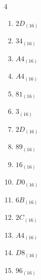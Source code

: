 \begin{multicols}{4}
\begin{enumerate}
        \phantom{$=87$}

\columnbreak %

  \item $2D_{(16)}$

        \phantom{$=45$}

  \item $34_{(16)}$

        \phantom{$=52$}

  \item $A4_{(16)}$

        \phantom{$=164$}

  \item $A4_{(16)}$

        \phantom{$=164$}

  \item $81_{(16)}$

        \phantom{$=129$}

  \item $3_{(16)}$

        \phantom{$=3$}

  \item $2D_{(16)}$

        \phantom{$=45$}

  \item $89_{(16)}$

        \phantom{$=137$}

  \item $16_{(16)}$

        \phantom{$=22$}

  \item $D0_{(16)}$

        \phantom{$=208$}

  \item $6B_{(16)}$

        \phantom{$=107$}

  \item $2C_{(16)}$

        \phantom{$=44$}

  \item $A4_{(16)}$

        \phantom{$=164$}

  \item $D8_{(16)}$

        \phantom{$=216$}

  \item $96_{(16)}$

        \phantom{$=150$}


\end{enumerate}
\end{multicols}
